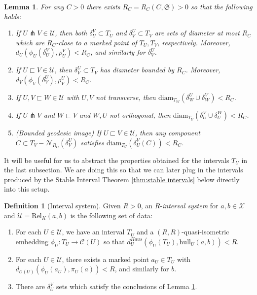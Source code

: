 \documentclass{amsart}
\newtheorem{lemma}[theorem]{Lemma}
\theoremstyle{definition}
\newtheorem{definition}[theorem]{Definition}
\theoremstyle{remark}
\theoremstyle{definition}
\newcommand{\calC}{\mathcal{C}}
\newcommand{\calN}{\mathcal{N}}
\newcommand{\calU}{\mathcal{U}}
\newcommand{\calX}{\mathcal{X}}
\newcommand{\Rel}{\mathrm{Rel}}
\newcommand{\diam}{\mathrm{diam}}
\newcommand{\hull}{\mathrm{hull}}
\newcommand{\nest}{\sqsubset}
\begin{document}
\begin{lemma}\label{lem:interval control}
For any $C>0$ there exists $R_C = R_C(C,\mathfrak S)>0$ so that the following holds:

\begin{enumerate}
    \item If $U \pitchfork V \in \calU$, then both $\delta^V_U \subset T_U$ and $\delta^U_V \subset T_V$ are sets of diameter at most $R_C$ which are $R_C$-close to a marked point of $T_U,T_V$, respectively.  Moreover, $d_U(\phi_U(\delta^V_U), \rho^V_U)<R_C$, and similarly for $\delta^U_V$.
    \item If $U \nest V \in \calU$, then $\delta^U_V \subset T_V$ has diameter bounded by $R_C$.  Moreover, $d_V(\phi_V(\delta^U_V), \rho^U_V)<R_C$.
     \item If $U, V \nest W \in \calU$ with $U,V$ not transverse, then $\diam_{T_W}(\delta^U_W \cup \delta^V_W) < R_C$.
    \item If $U \pitchfork V$ and $W \nest V$ and $W,U$ not orthogonal, then $\diam_{T_U}(\delta^V_U \cup \delta^W_U)<R_C$.
    \item(Bounded geodesic image) If $U \nest V \in \calU$, then any component $C \subset T_V - \calN_{R_C}(\delta^U_V)$ satisfies $\diam_{T_U}(\delta^V_U(C))<R_C$.
  
\end{enumerate}

\end{lemma}

It will be useful for us to abstract the properties obtained for the intervals $T_U$ in the last subsection.  We are doing this so that we can later plug in the intervals produced by the Stable Interval Theorem \ref{thm:stable intervals} below directly into this setup.

\begin{definition}[Interval system]\label{defn:interval axioms}
Given $R>0$, an $R$-\emph{interval system} for $a,b \in \calX$ and $\calU = \Rel_K(a,b)$ is the following set of data:
\begin{enumerate}
\item For each $U \in \calU$, we have an interval $T_U$ and a $(R,R)$-quasi-isometric embedding $\phi_U:T_U \to \calC(U)$ so that $d^{Haus}_U(\phi_U(T_U), \hull_U(a,b))<R$.
\item For each $U \in\calU$, there exists a marked point $a_U \in T_U$ with $d_{\calC(U)}(\phi_U(a_U),\pi_U(a))<R$, and similarly for $b$.
\item There are $\delta^V_U$ sets which satisfy the conclusions of Lemma \ref{lem:interval control}.


\end{enumerate}
\end{definition}
\end{document}
